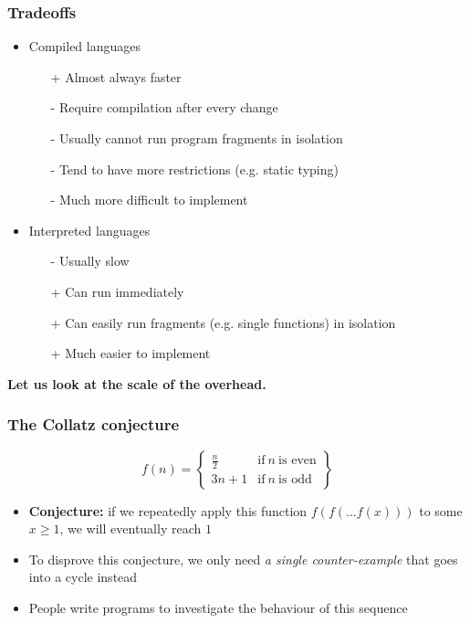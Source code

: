 \documentclass[rgb,dvipsnames,aspectratio=169,xcolor=table]{beamer}
\begin{document}
\begin{frame}
  \frametitle{Tradeoffs}

  \begin{itemize}
  \item Compiled languages
    \begin{itemize}
    \item[+] Almost always faster
    \item[-] Require compilation after every change
    \item[-] Usually cannot run program fragments in isolation
    \item[-] Tend to have more restrictions (e.g. static typing)
    \item[-] Much more difficult to implement
    \end{itemize}\pause
  \item Interpreted languages
    \begin{itemize}
    \item[-] Usually slow
    \item[+] Can run immediately
    \item[+] Can easily run fragments (e.g. single functions) in isolation
    \item[+] Much easier to implement
    \end{itemize}
  \end{itemize}

  \pause\bigskip

  \begin{center}
    \textbf{Let us look at the scale of the overhead.}
  \end{center}

\end{frame}

\begin{frame}
  \frametitle{The Collatz conjecture}

\[
  f(n) = \left\{
    \begin{array}{ll}
      \frac{n}{2} & \text{if}~n~\text{is even} \\
      3n+1 & \text{if}~n~\text{is odd}
    \end{array}
  \right\}
\]

\begin{itemize}
\item \textbf{Conjecture:} if we repeatedly apply this function
  $f(f(\ldots f(x)))$ to some $x \geq 1$, we will eventually reach $1$
\item To disprove this conjecture, we only need \textit{a single
    counter-example} that goes into a cycle instead
\item People write programs to investigate the behaviour of this
  sequence
\end{itemize}

\end{frame}
\end{document}
